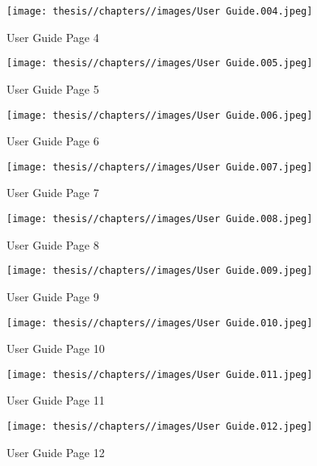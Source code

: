 \begin{figure} [H]
    \centering
    \texttt{[image: thesis//chapters//images/User Guide.004.jpeg]}
    \caption{User Guide Page 4}
    \label{fig:enter-label}
\end{figure}

\begin{figure} [H]
    \centering
    \texttt{[image: thesis//chapters//images/User Guide.005.jpeg]}
    \caption{User Guide Page 5}
    \label{fig:enter-label}
\end{figure}

\begin{figure} [H]
    \centering
    \texttt{[image: thesis//chapters//images/User Guide.006.jpeg]}
    \caption{User Guide Page 6}
    \label{fig:enter-label}
\end{figure}

\begin{figure} [H]
    \centering
    \texttt{[image: thesis//chapters//images/User Guide.007.jpeg]}
    \caption{User Guide Page 7}
    \label{fig:enter-label}
\end{figure}

\begin{figure} [H]
    \centering
    \texttt{[image: thesis//chapters//images/User Guide.008.jpeg]}
    \caption{User Guide Page 8}
    \label{fig:enter-label}
\end{figure}

\begin{figure} [H]
    \centering
    \texttt{[image: thesis//chapters//images/User Guide.009.jpeg]}
    \caption{User Guide Page 9}
    \label{fig:enter-label}
\end{figure}

\begin{figure} [H]
    \centering
    \texttt{[image: thesis//chapters//images/User Guide.010.jpeg]}
    \caption{User Guide Page 10}
    \label{fig:enter-label}
\end{figure}

\begin{figure} [H]
    \centering
    \texttt{[image: thesis//chapters//images/User Guide.011.jpeg]}
    \caption{User Guide Page 11}
    \label{fig:enter-label}
\end{figure}

\begin{figure} [H]
    \centering
    \texttt{[image: thesis//chapters//images/User Guide.012.jpeg]}
    \caption{User Guide Page 12}
    \label{fig:enter-label}
\end{figure}

